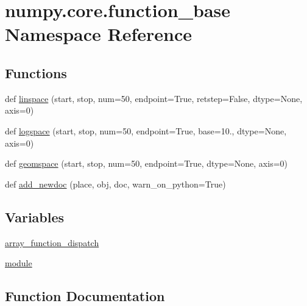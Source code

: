 \hypertarget{namespacenumpy_1_1core_1_1function__base}{}\section{numpy.\+core.\+function\+\_\+base Namespace Reference}
\label{namespacenumpy_1_1core_1_1function__base}
\subsection*{Functions}
\begin{DoxyCompactItemize}
\item 
def \hyperlink{namespacenumpy_1_1core_1_1function__base_a862c72ee6263594acd4800a760179c42}{linspace} (start, stop, num=50, endpoint=True, retstep=False, dtype=None, axis=0)
\item 
def \hyperlink{namespacenumpy_1_1core_1_1function__base_a5ceb5a989bdff2dff89633612912686f}{logspace} (start, stop, num=50, endpoint=True, base=10., dtype=None, axis=0)
\item 
def \hyperlink{namespacenumpy_1_1core_1_1function__base_a9807dcedd10fa5ef1b6ac11fd2b9247c}{geomspace} (start, stop, num=50, endpoint=True, dtype=None, axis=0)
\item 
def \hyperlink{namespacenumpy_1_1core_1_1function__base_a44125f12bbf93f7acaae09946f3487e2}{add\+\_\+newdoc} (place, obj, doc, warn\+\_\+on\+\_\+python=True)
\end{DoxyCompactItemize}
\subsection*{Variables}
\begin{DoxyCompactItemize}
\item 
\hyperlink{namespacenumpy_1_1core_1_1function__base_ab747ac78f568825def99f439f463736b}{array\+\_\+function\+\_\+dispatch}
\item 
\hyperlink{namespacenumpy_1_1core_1_1function__base_aed21068da2537f63888b104d1d128db2}{module}
\end{DoxyCompactItemize}


\subsection{Function Documentation}
\mbox{\label{namespacenumpy_1_1core_1_1function__base_a44125f12bbf93f7acaae09946f3487e2}} 

